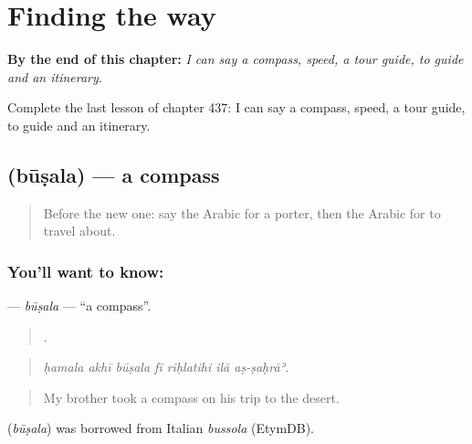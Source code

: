 
\chapter{Finding the way}
\label{ch:ar-finding-the-way}

\begin{chapteropening}
\textbf{By the end of this chapter:} \emph{I can say a compass, speed, a tour guide, to guide and an itinerary.}

Complete the last lesson of chapter 437: I can say a compass, speed, a tour guide, to guide and an itinerary.
\end{chapteropening}

\section[\texorpdfstring{\ar{بوصلة} (būṣala)}{بوصلة (būṣala)}]{ (būṣala) — a compass}

\label{lesson:AR-C437-busala}



\begin{quote}
Before the new one: say the Arabic for a porter, then the Arabic for to travel about.
\end{quote}

\subsection*{You'll want to know: }
\textbf{} — \emph{būṣala} — \textquotedblleft{}a compass\textquotedblright{}.

\begin{quote}
      .
\end{quote}

\begin{quote}
\emph{ḥamala akhī būṣala fī riḥlatihi ilā aṣ-ṣaḥrāʾ.}
\end{quote}

\begin{quote}
My brother took a compass on his trip to the desert.
\end{quote}

\begin{cousinweb}
\textbf{} (\emph{būṣala}) was borrowed from Italian \emph{bussola} (EtymDB).
\end{cousinweb}

